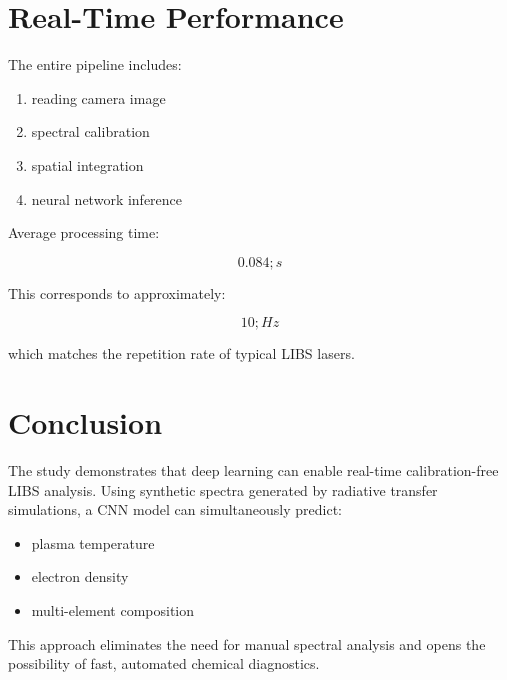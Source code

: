 \documentclass[12pt]{article}
\begin{document}
\section{Real-Time Performance}
The entire pipeline includes:

\begin{enumerate}
\item reading camera image
\item spectral calibration
\item spatial integration
\item neural network inference
\end{enumerate}

Average processing time:

\begin{equation}
0.084 ; s
\end{equation}

This corresponds to approximately:

\begin{equation}
10 ; Hz
\end{equation}

which matches the repetition rate of typical LIBS lasers.

\section{Conclusion}
The study demonstrates that deep learning can enable real-time calibration-free LIBS analysis. Using synthetic spectra generated by radiative transfer simulations, a CNN model can simultaneously predict:

\begin{itemize}
\item plasma temperature
\item electron density
\item multi-element composition
\end{itemize}

This approach eliminates the need for manual spectral analysis and opens the possibility of fast, automated chemical diagnostics.
\end{document}
